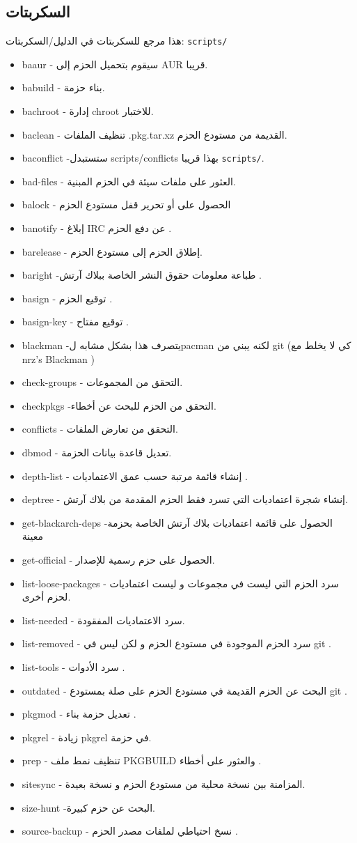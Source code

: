 \documentclass[a4paper, oneside, 11pt]{book}
\begin{document}
\subsection{السكربتات}
هذا مرجع للسكربتات في الدليل/السكربتات:  \verb|scripts/|
\begin{itemize}
\item baaur - سيقوم  بتحميل الحزم إلى AUR قريبا.
\item babuild - بناء حزمة.
\item bachroot - إدارة chroot للاختبار.
\item baclean - تنظيف الملفات .pkg.tar.xz القديمة من مستودع الحزم.
\item baconflict -ستستبدل scripts/conflicts بهذا قريبا \verb|scripts/|.
\item bad-files - العثور على ملفات سيئة في الحزم المبنية.
\item balock - الحصول على أو تحرير قفل مستودع الحزم
\item banotify - إبلاغ IRC عن دفع الحزم .
\item barelease - إطلاق الحزم إلى مستودع الحزم.
\item baright -طباعة معلومات حقوق النشر الخاصة ببلاك آرتش .
\item basign - توقيع الحزم .
\item basign-key - توقيع مفتاح .
\item blackman -يتصرف هذا بشكل مشابه لpacman لكنه يبني من git (كي لا يخلط مع nrz's Blackman )
\item check-groups - التحقق من المجموعات.
\item checkpkgs -التحقق من الحزم للبحث عن أخطاء.
\item conflicts - التحقق من تعارض الملفات.
\item dbmod - تعديل قاعدة بيانات الحزمة.
\item depth-list - إنشاء قائمة مرتبة حسب عمق الاعتماديات .
\item deptree - إنشاء شجرة اعتماديات التي تسرد فقط الحزم المقدمة من بلاك آرتش.
\item get-blackarch-deps -الحصول على قائمة اعتماديات بلاك آرتش الخاصة بحزمة معينة 
\item get-official - الحصول على حزم رسمية للإصدار.
\item list-loose-packages - سرد الحزم التي ليست في مجموعات و ليست اعتماديات لحزم أخرى.
\item list-needed - سرد الاعتماديات المفقودة.
\item list-removed - سرد الحزم الموجودة في مستودع الحزم و لكن ليس في git .
\item list-tools - سرد الأدوات .
\item outdated - البحث عن الحزم القديمة في مستودع الحزم على صلة بمستودع git .
\item pkgmod - تعديل حزمة بناء .
\item pkgrel - زيادة pkgrel في حزمة.
\item prep - تنظيف نمط ملف PKGBUILD والعثور على أخطاء .
\item sitesync - المزامنة بين نسخة محلية من مستودع الحزم و نسخة بعيدة.
\item size-hunt -البحث عن حزم كبيرة.
\item source-backup - نسخ احتياطي لملفات مصدر الحزم .
\end{itemize}
\end{document}
